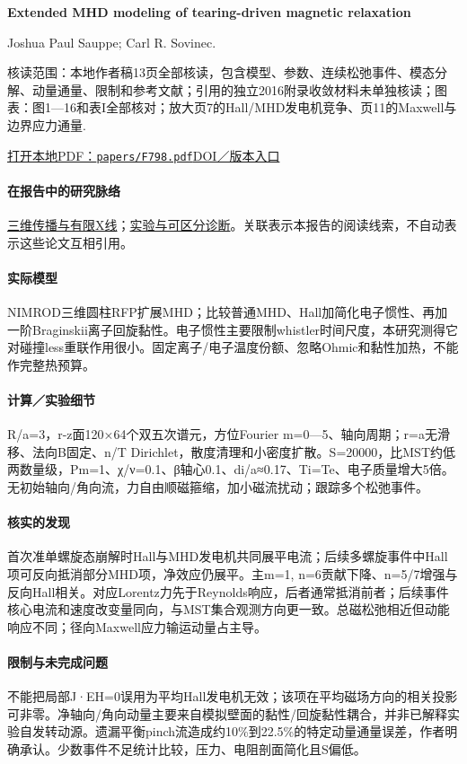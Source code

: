 \textbf{Extended MHD modeling of tearing-driven magnetic relaxation}\citep{F798}\

Joshua Paul Sauppe;  Carl R. Sovinec.

\textsf{核读范围：}本地作者稿13页全部核读，包含模型、参数、连续松弛事件、模态分解、动量通量、限制和参考文献；引用的独立2016附录收敛材料未单独核读；\textsf{图表：}图1—16和表I全部核对；放大页7的Hall/MHD发电机竞争、页11的Maxwell与边界应力通量.

\href{run:papers/F798.pdf}{打开本地PDF：\texttt{papers/F798.pdf}}\quad\href{https://doi.org/10.1063/1.4977540}{DOI／版本入口}

\paragraph{在报告中的研究脉络}\hyperref[story:three]{三维传播与有限X线}；\hyperref[story:diagnostic]{实验与可区分诊断}。关联表示本报告的阅读线索，不自动表示这些论文互相引用。

\paragraph{实际模型}NIMROD三维圆柱RFP扩展MHD；比较普通MHD、Hall加简化电子惯性、再加一阶Braginskii离子回旋黏性。电子惯性主要限制whistler时间尺度，本研究测得它对碰撞less重联作用很小。固定离子/电子温度份额、忽略Ohmic和黏性加热，不能作完整热预算。

\paragraph{计算／实验细节}R/a=3，r-z面120×64个双五次谱元，方位Fourier m=0—5、轴向周期；r=a无滑移、法向B固定、n/T Dirichlet，散度清理和小密度扩散。S=20000，比MST约低两数量级，Pm=1、χ/ν=0.1、β轴心0.1、di/a≈0.17、Ti=Te、电子质量增大5倍。无初始轴向/角向流，力自由顺磁箍缩，加小磁流扰动；跟踪多个松弛事件。

\paragraph{核实的发现}首次准单螺旋态崩解时Hall与MHD发电机共同展平电流；后续多螺旋事件中Hall项可反向抵消部分MHD项，净效应仍展平。主m=1, n=6贡献下降、n=5/7增强与反向Hall相关。对应Lorentz力先于Reynolds响应，后者通常抵消前者；后续事件核心电流和速度改变量同向，与MST集合观测方向更一致。总磁松弛相近但动能响应不同；径向Maxwell应力输运动量占主导。

\paragraph{限制与未完成问题}不能把局部J·EH=0误用为平均Hall发电机无效；该项在平均磁场方向的相关投影可非零。净轴向/角向动量主要来自模拟壁面的黏性/回旋黏性耦合，并非已解释实验自发转动源。遗漏平衡pinch流造成约10\%到22.5\%的特定动量通量误差，作者明确承认。少数事件不足统计比较，压力、电阻剖面简化且S偏低。


